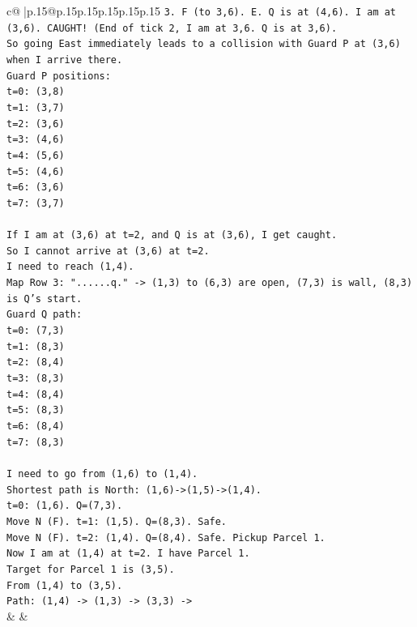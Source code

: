\documentclass{article}
\begin{document}
{\begin{supertabular}{c@{$\;$}|p{.15\linewidth}@{}p{.15\linewidth}p{.15\linewidth}p{.15\linewidth}p{.15\linewidth}p{.15\linewidth}}
{{{\texttt{3. F (to 3,6). E. Q is at (4,6). I am at (3,6). CAUGHT! (End of tick 2, I am at 3,6. Q is at 3,6).} \\
\texttt{So going East immediately leads to a collision with Guard P at (3,6) when I arrive there.} \\
\texttt{Guard P positions:} \\
\texttt{t=0: (3,8)} \\
\texttt{t=1: (3,7)} \\
\texttt{t=2: (3,6)} \\
\texttt{t=3: (4,6)} \\
\texttt{t=4: (5,6)} \\
\texttt{t=5: (4,6)} \\
\texttt{t=6: (3,6)} \\
\texttt{t=7: (3,7)} \\
\\ 
\texttt{If I am at (3,6) at t=2, and Q is at (3,6), I get caught.} \\
\texttt{So I cannot arrive at (3,6) at t=2.} \\
\texttt{I need to reach (1,4).} \\
\texttt{Map Row 3: "......q." {-}> (1,3) to (6,3) are open, (7,3) is wall, (8,3) is Q's start.} \\
\texttt{Guard Q path:} \\
\texttt{t=0: (7,3)} \\
\texttt{t=1: (8,3)} \\
\texttt{t=2: (8,4)} \\
\texttt{t=3: (8,3)} \\
\texttt{t=4: (8,4)} \\
\texttt{t=5: (8,3)} \\
\texttt{t=6: (8,4)} \\
\texttt{t=7: (8,3)} \\
\\ 
\texttt{I need to go from (1,6) to (1,4).} \\
\texttt{Shortest path is North: (1,6){-}>(1,5){-}>(1,4).} \\
\texttt{t=0: (1,6). Q=(7,3).} \\
\texttt{Move N (F). t=1: (1,5). Q=(8,3). Safe.} \\
\texttt{Move N (F). t=2: (1,4). Q=(8,4). Safe. Pickup Parcel 1.} \\
\texttt{Now I am at (1,4) at t=2. I have Parcel 1.} \\
\texttt{Target for Parcel 1 is (3,5).} \\
\texttt{From (1,4) to (3,5).} \\
\texttt{Path: (1,4) {-}> (1,3) {-}> (3,3) {-}>} \\
            }
        }
    }
    & & \\ \\


\end{supertabular}}
\end{document}

